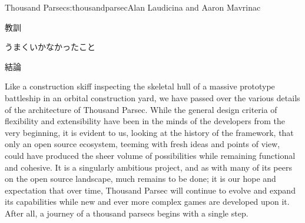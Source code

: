 \begin{aosachapter}{Thousand Parsec}{s:thousandparsec}{Alan Laudicina and Aaron Mavrinac}
\begin{aosasect1}{教訓}
\begin{aosasect2}{うまくいかなかったこと}
\end{aosasect2}

\begin{aosasect2}{結論}

Like a construction skiff inspecting the skeletal hull of a massive
prototype battleship in an orbital construction yard, we have passed
over the various details of the architecture of Thousand Parsec. While
the general design criteria of flexibility and extensibility have been
in the minds of the developers from the very beginning, it is evident
to us, looking at the history of the framework, that only an open
source ecosystem, teeming with fresh ideas and points of view, could
have produced the sheer volume of possibilities while remaining
functional and cohesive. It is a singularly ambitious project, and as
with many of its peers on the open source landscape, much remains to
be done; it is our hope and expectation that over time, Thousand
Parsec will continue to evolve and expand its capabilities while new
and ever more complex games are developed upon it. After all, a
journey of a thousand parsecs begins with a single step.

\end{aosasect2}

\end{aosasect1}

\end{aosachapter}
